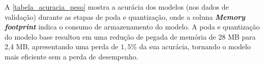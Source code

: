 A \autoref{tabela_acuracia_peso} mostra a acurácia dos modelos (nos dados de validação) durante as etapas de poda e
quantização, onde a coluna \textbf{\textit{Memory footprint}}  indica o consumo de armazenamento do modelo.
A poda e quantização do modelo base resultou em uma redução de pegada de memória de 28 MB para 2,4 MB, apresentando uma perda
de $1,5\%$ da sua acurácia, tornando o modelo mais eficiente sem a perda de desempenho.
